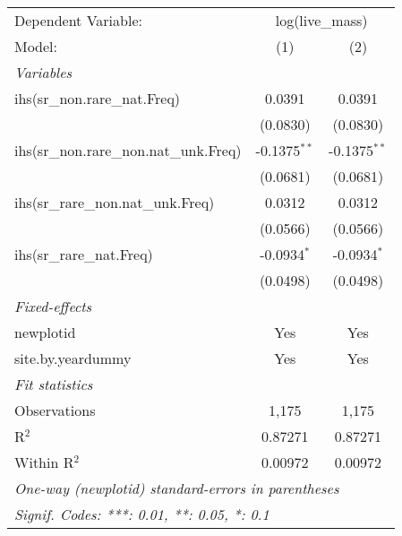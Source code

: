 \begin{tabular}{lcc}
\tabularnewline\midrule\midrule
Dependent Variable:&\multicolumn{2}{c}{log(live\_mass)}\\
Model:&(1) & (2)\\
\midrule \emph{Variables}&   &  \\
ihs(sr\_non.rare\_nat.Freq)&0.0391 & 0.0391\\
  &(0.0830) & (0.0830)\\
ihs(sr\_non.rare\_non.nat\_unk.Freq)&-0.1375$^{**}$ & -0.1375$^{**}$\\
  &(0.0681) & (0.0681)\\
ihs(sr\_rare\_non.nat\_unk.Freq)&0.0312 & 0.0312\\
  &(0.0566) & (0.0566)\\
ihs(sr\_rare\_nat.Freq)&-0.0934$^{*}$ & -0.0934$^{*}$\\
  &(0.0498) & (0.0498)\\
\midrule \emph{Fixed-effects}&   &  \\
newplotid & Yes & Yes\\
site.by.yeardummy & Yes & Yes\\
\midrule \emph{Fit statistics}&  & \\
Observations & 1,175&1,175\\
R$^2$ & 0.87271&0.87271\\
Within R$^2$ & 0.00972&0.00972\\
\midrule\midrule\multicolumn{3}{l}{\emph{One-way (newplotid) standard-errors in parentheses}}\\
\multicolumn{3}{l}{\emph{Signif. Codes: ***: 0.01, **: 0.05, *: 0.1}}\\
\end{tabular}


